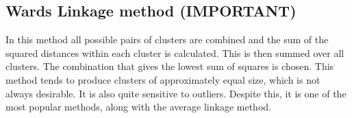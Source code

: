 \documentclass[a4paper,12pt]{report}
\begin{document}
\subsection{Wards Linkage method (IMPORTANT)}
In this method all possible pairs of clusters are combined and the sum of the squared
distances within each cluster is calculated. This is then summed over all clusters. The
combination that gives the lowest sum of squares is chosen. This method tends to
produce clusters of approximately equal size, which is not always desirable. It is also
quite sensitive to outliers. Despite this, it is one of the most popular methods, along
with the average linkage method.

%
%
%
%
%


%
%

\end{document}

